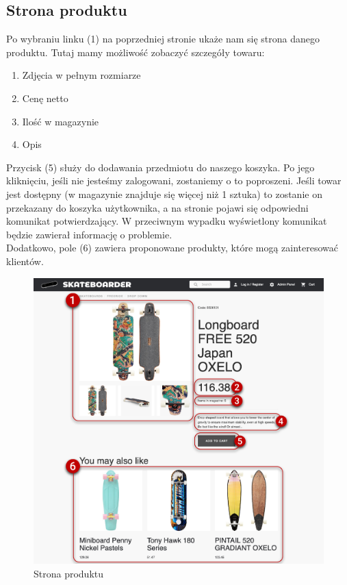 \documentclass[12pt,a4paper,titlepage]{article}
\begin{document}
\subsection{Strona produktu}
Po wybraniu linku (1) na poprzedniej stronie ukaże nam się strona danego produktu. Tutaj mamy możliwość zobaczyć szczegóły towaru:
\begin{enumerate}
    \item Zdjęcia w pełnym rozmiarze
    \item Cenę netto
    \item Ilość w magazynie
    \item Opis
\end{enumerate}
Przycisk (5) służy do dodawania przedmiotu do naszego koszyka. Po jego kliknięciu, jeśli nie jesteśmy zalogowani, zostaniemy o to poproszeni. Jeśli towar jest dostępny (w magazynie znajduje się więcej niż 1 sztuka) to zostanie on przekazany do koszyka użytkownika, a na stronie pojawi się odpowiedni komunikat potwierdzający. W przeciwnym wypadku wyświetlony komunikat będzie zawierał informację o problemie.\\
Dodatkowo, pole (6) zawiera proponowane produkty, które mogą zainteresować klientów. 
\begin{figure}[H]
    \centering
    \includegraphics[width=14cm]{Pics/product1.png}
    \caption{Strona produktu}
    \label{pic:productPage1}
\end{figure}
\end{document}
